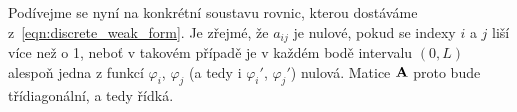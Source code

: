 Podívejme se nyní na konkrétní soustavu rovnic, kterou dostáváme z~\eqref{eqn:discrete_weak_form}.
Je zřejmé, že $a_{ij}$ je nulové, pokud se indexy $i$ a $j$ liší více než o 1, neboť v takovém případě je v každém bodě intervalu $(0,L)$ alespoň jedna z funkcí $\varphi_i$, $\varphi_j$ (a tedy i $\varphi_i'$, $\varphi_j'$) nulová. Matice $\mathbf{A}$ proto bude třídiagonální, a tedy řídká.



